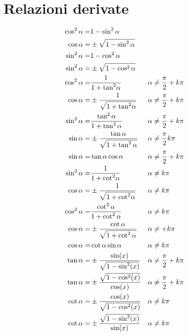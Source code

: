 \section{Relazioni derivate}\label{sec:relazioni-derivate}
\begin{align*}
\cos^{2}\alpha=&{}1-\sin^{2}\alpha\\\index{Coseno!dato!seno}
\cos\alpha=&{}\pm\sqrt{1-\sin^{2}\alpha}\\
\sin^{2}\alpha=&{}1-\cos^{2}\alpha \\\index{Seno!dato!coseno}
\sin^{2}\alpha=&{}\pm\sqrt{1-\cos^{2}\alpha}\\
\cos^{2}\alpha=&{}\dfrac{1}{1+{\tan}^{2}\alpha} &&\alpha\neq\dfrac{\pi}{2}+k\pi\\
\cos\alpha=&{}\pm\dfrac{1}{\sqrt{1+{\tan}^{2}\alpha}} &&\alpha\neq\dfrac{\pi}{2}+k\pi\\\index{Coseno!dato!tangente}
\sin^{2}\alpha=&{}\dfrac{\tan^{2}\alpha}{1+\tan^{2}\alpha}&&\alpha\neq\dfrac{\pi}{2}+k\pi\\
\sin\alpha=&{}\pm\dfrac{\tan\alpha}{\sqrt{1+\tan^{2}\alpha}}&&\alpha\neq\dfrac{\pi}{2}k\pi\\\index{Seno!dato!tangente}
 \sin\alpha=&{}\tan\alpha\cos\alpha&&\alpha\neq\dfrac{\pi}{2}+k\pi\\\index{Seno!dato!tangente}
\sin^{2}\alpha=&{}\dfrac{1}{1+{\cot}^{2}\alpha} &&\alpha\neq k\pi\\
\cos\alpha=&{}\pm\dfrac{1}{\sqrt{1+{\cot}^{2}\alpha}} &&\alpha\neq k\pi\\\index{Coseno!dato!cotangente}
\cos^{2}\alpha=&{}\dfrac{\cot^{2}\alpha}{1+\cot^{2}\alpha}&&\alpha\neq k\pi\\
\cos\alpha=&{}\pm\dfrac{\cot\alpha}{\sqrt{1+\cot^{2}\alpha}}&&\alpha\neq+k\pi\\\index{Coseno!dato!cotangente}
\cos\alpha=&{}\cot\alpha\sin\alpha&&\alpha\neq k\pi\\\index{Coseno!dato!cotangente} 
\tan\alpha=&{}\pm\dfrac{\sin(x)}{\sqrt{1-\sin^2(x)}}&&\alpha\neq\dfrac{\pi}{2}+k\pi\\\index{Tangente!dato!seno}
\tan\alpha=&{}\pm\dfrac{\sqrt{1-\cos^2(x)}}{\cos(x)}
&&\alpha\neq\dfrac{\pi}{2}+k\pi\\ \index{Tangente!dato!coseno}
\cot\alpha=&{}\pm\dfrac{\cos(x)}{\sqrt{1-\cos^2(x)}}&&\alpha\neq k\pi\\\index{Cotangente!dato!coseno}
\cot\alpha=&{}\pm\dfrac{\sqrt{1-\sin^2(x)}}{\sin(x)}
&&\alpha\neq k\pi\index{Cotangente!dato!seno}
\end{align*}
